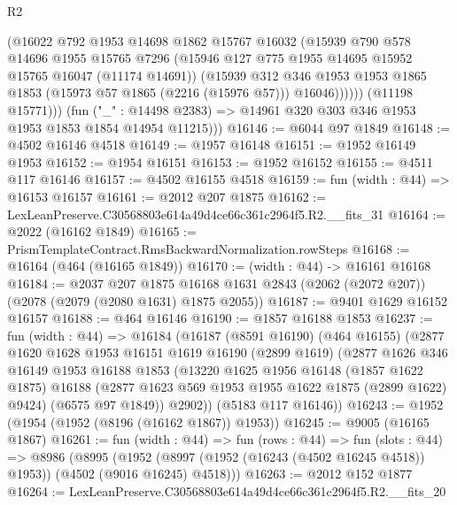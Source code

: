 \begin{lexlean}{R2}
\begin{coremodule}
                  (@16022
                    @792
                    @1953
                    @14698
                    @1862
                    @15767
                    @16032
                    (@15939
                      @790
                      @578
                      @14696
                      @1955
                      @15765
                      @7296
                      (@15946 @127 @775 @1955 @14695 @15952 @15765 @16047 (@11174 @14691))
                      (@15939
                        @312
                        @346
                        @1953
                        @1953
                        @1865
                        @1853
                        (@15973 @57 @1865 (@2216 (@15976 @57)))
                        @16046))))))
            (@11198 @15771)))
        (fun ("_" : @14498 @2383) => @14961 @320 @303 @346 @1953 @1953 @1853 @1854 @14954 @11215)))
@16146 := @6044 @97 @1849
@16148 := @4502 @16146 @4518
@16149 := @1957 @16148
@16151 := @1952 @16149 @1953
@16152 := @1954 @16151
@16153 := @1952 @16152
@16155 := @4511 @117 @16146
@16157 := @4502 @16155 @4518
@16159 := fun (width : @44) => @16153 @16157
@16161 := @2012 @207 @1875
@16162 := LexLeanPreserve.C30568803e614a49d4ce66c361c2964f5.R2.__fits_31
@16164 := @2022 (@16162 @1849)
@16165 := PrismTemplateContract.RmsBackwardNormalization.rowSteps
@16168 := @16164 (@464 (@16165 @1849))
@16170 := (width : @44) -> @16161 @16168
@16184 := @2037
    @207
    @1875
    @16168
    @1631
    @2843
    (@2062 (@2072 @207))
    (@2078 (@2079 (@2080 @1631) @1875 @2055))
@16187 := @9401 @1629 @16152 @16157
@16188 := @464 @16146
@16190 := @1857 @16188 @1853
@16237 := fun (width : @44) =>
  @16184
    (@16187
      (@8591 @16190)
      (@464 @16155)
      (@2877
        @1620
        @1628
        @1953
        @16151
        @1619
        @16190
        (@2899 @1619)
        (@2877
          @1626
          @346
          @16149
          @1953
          @16188
          @1853
          (@13220
            @1625
            @1956
            @16148
            (@1857 @1622 @1875)
            @16188
            (@2877 @1623 @569 @1953 @1955 @1622 @1875 (@2899 @1622) @9424)
            (@6575 @97 @1849))
          @2902))
      (@5183 @117 @16146))
@16243 := @1952 (@1954 (@1952 (@8196 (@16162 @1867)) @1953))
@16245 := @9005 (@16165 @1867)
@16261 := fun (width : @44) =>
  fun (rows : @44) =>
  fun (slots : @44) =>
  @8986
    (@8995 (@1952 (@8997 (@1952 (@16243 (@4502 @16245 @4518)) @1953)) (@4502 (@9016 @16245) @4518)))
@16263 := @2012 @152 @1877
@16264 := LexLeanPreserve.C30568803e614a49d4ce66c361c2964f5.R2.__fits_20

\end{coremodule}
\end{lexlean}
